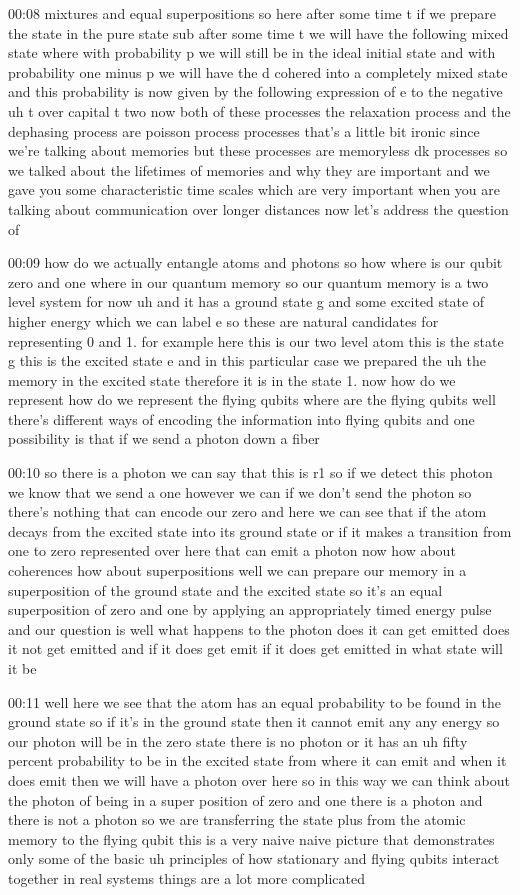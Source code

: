 00:08
mixtures and equal superpositions so here after some time t if we prepare
the state in the pure state sub after some time t we will have the following
mixed state where with probability p we will still be
in the ideal initial state and with probability one minus p
we will have the d cohered into a completely mixed state
and this probability is now given by the following expression
of e to the negative uh t over capital t two now both of these processes the
relaxation process and the dephasing process
are poisson process processes that's a little bit ironic since we're talking
about memories but these processes are memoryless dk processes
so we talked about the lifetimes of memories and why they are important
and we gave you some characteristic time scales
which are very important when you are talking about communication over
longer distances now let's address the question of

00:09
how do we actually entangle atoms and photons so
how where is our qubit zero and one where in our quantum memory so our
quantum memory is a two level system for now uh and it has a ground state g
and some excited state of higher energy which we can label e
so these are natural candidates for representing 0 and 1.
for example here this is our two level atom
this is the state g this is the excited state e
and in this particular case we prepared the uh the memory in the excited state
therefore it is in the state 1. now how do we represent
how do we represent the flying qubits where are the flying qubits
well there's different ways of encoding the information
into flying qubits and one possibility is that if we send a photon down a fiber

00:10
so there is a photon we can say that this is r1
so if we detect this photon we know that we send a one
however we can if we don't send the photon so there's nothing
that can encode our zero and here we can see that if the atom
decays from the excited state into its ground state
or if it makes a transition from one to zero
represented over here that can emit a photon now how about coherences how about
superpositions well we can prepare our memory in a superposition of the ground
state and the excited state so it's an equal superposition of
zero and one by applying an appropriately timed energy pulse and our question is
well what happens to the photon does it can get emitted does it not get emitted
and if it does get emit if it does get emitted in what state will it be

00:11
well here we see that the atom has an equal probability to be found in
the ground state so if it's in the ground state then it cannot emit any
any energy so our photon will be in the zero state
there is no photon or it has an uh fifty percent probability
to be in the excited state from where it can emit and when it does emit
then we will have a photon over here so in this way
we can think about the photon of being in a super position of zero
and one there is a photon and there is not a photon
so we are transferring the state plus from the atomic memory to the flying
qubit this is a very naive naive picture that demonstrates
only some of the basic uh principles of how stationary and flying qubits
interact together in real systems things are a lot more complicated

